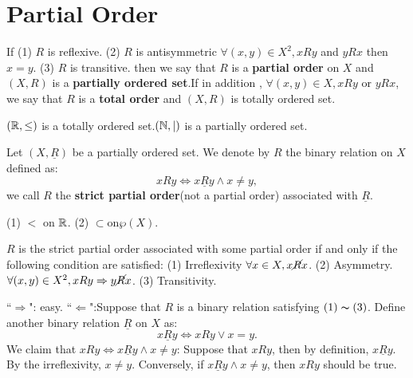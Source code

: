 \section{Partial Order}
\begin{definitionenv}
    If 
    \newline
    (1) $R$ is reflexive.
    \newline
    (2) $R$ is antisymmetric $\forall (x, y)\in X^2, xRy $ and $yRx$ then $x=y$.
    \newline
    (3) $R$ is transitive.
    \newline
    then we say that $R$ is a \textbf{partial order} on $X$ and $(X, R) $ is a \textbf{partially ordered set}.If in addition , $\forall (x, y)\in X , xRy$ or $yRx$,  we say that $R$ is a \textbf{total order} and $(X, R)$ is totally ordered set. 
\end{definitionenv}
\begin{exampleenv}
    $(\mathbb{R} , \le)$ is a totally ordered set.$(\mathbb{N} , \mid )$ is a partially ordered set.  
\end{exampleenv}
\begin{definitionenv}
    Let $(X, \underline{R})$ be a partially ordered set. We denote by $R$ the binary relation on $X$ defined as:$$xRy \Leftrightarrow x\underline{R}y \wedge x\not=y, $$ we call $R$ the \textbf{strict partial order}(not a partial order) associated with $\underline{R}$.
\end{definitionenv}
\begin{exampleenv}
    \quad
    \newline
    (1) $<$ on $\mathbb{R}$.
    \newline
    (2) $\subset $on$ \wp (X)$.
\end{exampleenv}
\begin{propositionenv}
    $R$ is the strict partial order associated with some partial order if and only if the following condition are satisfied:
    \newline
    (1) Irreflexivity $\forall x\in X, x \cancel{R}x$.
    \newline
    (2) Asymmetry.$\forall (x, y)\in X^2, xRy\Rightarrow y\cancel{R}x$.
    \newline
    (3) Transitivity.
\end{propositionenv}
\begin{proofenv}
    ``$\Rightarrow$": easy.
    \newline
    ``$\Leftarrow$":Suppose that $R$ is a binary relation satisfying $(1)\thicksim(3)$. Define another binary relation $\underline{R}$ on $X$ as:
    $$x\underline{R}y\Leftrightarrow xRy \vee x=y.$$
    We claim that $xRy\Leftrightarrow x\underline{R}y \wedge x\not= y$:
    \newline
    Suppose that $xRy$,  then by definition,  $x\underline{R}y$. By the irreflexivity,  $x\not=y$.
    \newline
    Conversely,  if $x\underline{R}y\wedge x\not=y$, then $xRy$ should be true.
\end{proofenv}

